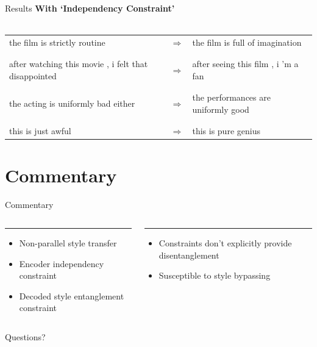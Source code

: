 \documentclass{beamer}
\begin{document}
\begin{frame}{Results}
  \centering
  {\large \textbf{With `Independency Constraint'}} \\
  \vspace{1cm} \\
  \small
  \begin{tabular}{ p{.4\linewidth} p{.05\linewidth} p{.4\linewidth} }
    the film is strictly routine & $\Rightarrow$ & the film is full of imagination \\  \\
    \hline \\
    after watching this movie , i felt that disappointed & $\Rightarrow$ & after seeing this film , i 'm a fan \\  \\
    \hline \\
    the acting is uniformly bad either & $\Rightarrow$ & the performances are uniformly good \\  \\
    \hline \\
    this is just awful & $\Rightarrow$ & this is pure genius
  \end{tabular}
\end{frame}

\section{Commentary}
\begin{frame}{Commentary}
  \begin{columns}[T] %
    \begin{column}{.48\textwidth}
    \color{tropicalrainforest}\rule{\linewidth}{4pt}
    \begin{itemize}
      \item Non-parallel style transfer
      \item Encoder independency constraint
      \item Decoded style entanglement constraint
    \end{itemize}
    \end{column}%
    \hfill%
    \begin{column}{.48\textwidth}
    \color{usccardinal}\rule{\linewidth}{4pt}
    \begin{itemize}
      \item Constraints don't explicitly provide disentanglement
      \item Susceptible to style bypassing
    \end{itemize}
    \end{column}%
  \end{columns}
\end{frame}

\begin{frame}
  \centering
  \Huge{Questions?}
\end{frame}
\end{document}
